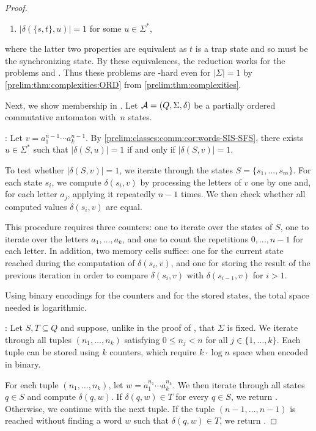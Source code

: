 \begin{proof}
\begin{enumerate}
		\item $|\delta(\{s,t\}, u)| = 1$ for some $u \in \Sigma^*$,
	\end{enumerate}
	where the latter two properties are equivalent
	as $t$ is a trap state and so must be the synchronizing state.
	By these equivalences,
	the reduction works for the problems \ST and \SFS.
	Thus these problems are \LOGSPACE-hard even for $|\Sigma| = 1$
	by \cref{prelim:thm:complexities:ORD} from \cref{prelim:thm:complexities}.
		
	Next, we show membership in \LOGSPACE.	
	Let $\mathcal A = (Q, \Sigma, \delta)$ be a partially ordered commutative automaton
	with~$n$ states.
		
	\underline{\SFS}: Let $v = a_1^{n-1}\cdots a_k^{n-1}$. By \cref{prelim:classes:comm:cor:words-SIS-SFS},
	there exists $u \in \Sigma^*$ such that $|\delta(S,u)| = 1$ if and only if
	$|\delta(S,v)| = 1$.
	
	To test whether $|\delta(S,v)| = 1$, we iterate through the states
	$S=\{s_1,\ldots,s_m\}$. For each state $s_i$, we compute $\delta(s_i,v)$
	by processing the letters of $v$ one by one and, for each letter $a_j$,
	applying it repeatedly $n-1$ times. We then check whether all
	computed values $\delta(s_i,v)$ are equal.
	
	This procedure requires three counters: one to iterate over the states of
	$S$, one to iterate over the letters $a_1,\ldots,a_k$, and one to count the
	repetitions $0,\ldots,n-1$ for each letter. In addition, two memory cells
	suffice: one for the current state reached during the computation of
	$\delta(s_i,v)$, and one for storing the result of the previous iteration in
	order to compare $\delta(s_i,v)$ with $\delta(s_{i-1},v)$ for $i>1$.
	
	Using binary encodings for the counters and for the stored states, the total
	space needed is logarithmic.
	
	\underline{\ST}: Let $S,T \subseteq Q$ and suppose, unlike in the proof of \SFS,
	that $\Sigma$ is fixed.
	We iterate through all tuples $(n_1,\ldots,n_k)$ satisfying
	$0 \le n_j < n$ for all $j \in \{1,\ldots,k\}$.
	Each tuple can be stored using $k$ counters, which require
	$k \cdot \log n$ space when encoded in binary.
	
	For each tuple $(n_1,\ldots,n_k)$, let
	$
	w = a_1^{n_1}\cdots a_k^{n_k}.
	$
	We then iterate through all states $q \in S$ and compute $\delta(q,w)$.
	If $\delta(q,w)\in T$ for every $q \in S$, we return \rYES.
	Otherwise, we continue with the next tuple.
	If the tuple $(n-1,\ldots,n-1)$ is reached without finding a 
	word $w$ such that $\delta(q,w)\in T$, we return \rNO.
	

\end{proof}
